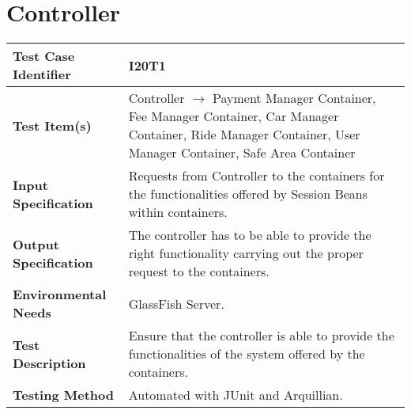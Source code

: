 \section{Controller}

\begin{tabular}{l p{}}
    \hline
    \textbf{Test Case Identifier} & I20T1\\
    \hline
    \textbf{Test Item(s)} & Controller $\rightarrow$ Payment Manager Container, Fee Manager Container, Car Manager Container, Ride Manager Container, User Manager Container, Safe Area Container\\
    \hline
    \textbf{Input Specification} & Requests from Controller to the containers for the functionalities offered by Session Beans within containers.\\
    \hline
    \textbf{Output Specification} &  The controller has to be able to provide the right functionality carrying out the proper request to the containers.\\
    \hline
    \textbf{Environmental Needs} & GlassFish Server. \\
    \hline
    \textbf{Test Description} & Ensure that the controller is able to provide the functionalities of the system offered by the containers.\\
    \hline
    \textbf{Testing Method} & Automated with JUnit and Arquillian.\\
    \hline
\end{tabular}